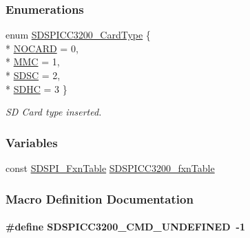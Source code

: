 \subsubsection*{Enumerations}
\begin{DoxyCompactItemize}
\item 
enum \hyperlink{_s_d_s_p_i_c_c3200_8h_aef9c37db8744ba414b93ef56c1473be7}{S\-D\-S\-P\-I\-C\-C3200\-\_\-\-Card\-Type} \{ \\*
\hyperlink{_s_d_s_p_i_c_c3200_8h_aef9c37db8744ba414b93ef56c1473be7a422cdc20ba86c8cdcf1f0fd2318a1cfc}{N\-O\-C\-A\-R\-D} = 0, 
\\*
\hyperlink{_s_d_s_p_i_c_c3200_8h_aef9c37db8744ba414b93ef56c1473be7aa7d8fca3406f36682514f0384d910fac}{M\-M\-C} = 1, 
\\*
\hyperlink{_s_d_s_p_i_c_c3200_8h_aef9c37db8744ba414b93ef56c1473be7a87550a2102744c14e5e2e0ed39cc04b2}{S\-D\-S\-C} = 2, 
\\*
\hyperlink{_s_d_s_p_i_c_c3200_8h_aef9c37db8744ba414b93ef56c1473be7ab27db2a19a825c3e6f1513cdab7c81ea}{S\-D\-H\-C} = 3
 \}
\begin{DoxyCompactList}\small\item\em S\-D Card type inserted. \end{DoxyCompactList}\end{DoxyCompactItemize}
\subsubsection*{Variables}
\begin{DoxyCompactItemize}
\item 
const \hyperlink{struct_s_d_s_p_i___fxn_table}{S\-D\-S\-P\-I\-\_\-\-Fxn\-Table} \hyperlink{_s_d_s_p_i_c_c3200_8h_af1a91900fe6e8604a690894b04bbbc7a}{S\-D\-S\-P\-I\-C\-C3200\-\_\-fxn\-Table}
\end{DoxyCompactItemize}


\subsubsection{Macro Definition Documentation}
\paragraph[{S\-D\-S\-P\-I\-C\-C3200\-\_\-\-C\-M\-D\-\_\-\-U\-N\-D\-E\-F\-I\-N\-E\-D}]{\setlength{\rightskip}{0pt plus 5cm}\#define S\-D\-S\-P\-I\-C\-C3200\-\_\-\-C\-M\-D\-\_\-\-U\-N\-D\-E\-F\-I\-N\-E\-D~-\/1}\label{_s_d_s_p_i_c_c3200_8h_abe8d67e530990ee0c3af10f83acf616f}


